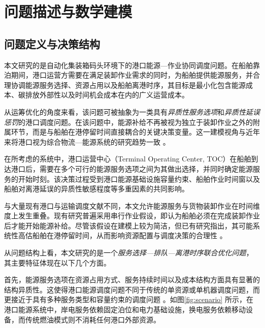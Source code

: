 \documentclass[UTF8, a4paper, 12pt]{ctexart}
\begin{document}

\section{问题描述与数学建模}
\label{sec:model}

\subsection{问题定义与决策结构}
\label{sec:problem_definition_cn}

本文研究的是自动化集装箱码头环境下的港口能源—作业协同调度问题。在船舶靠泊期间，港口运营方需要在满足装卸作业需求的同时，为船舶提供能源服务，并合理协调能源服务选择、资源占用以及船舶离港时序，其目标是最小化包含能源成本、碳排放外部性以及时间机会成本在内的广义运营成本。

从运筹优化的角度来看，该问题可被抽象为一类具有\emph{异质性服务选项}和\emph{异质性延误惩罚}的港口调度问题。在该问题中，能源补给不再被视为独立于装卸作业之外的附属环节，而是与船舶在港停留时间直接耦合的关键决策变量。这一建模视角与近年来将港口视为综合物流—能源系统的研究趋势一致 \cite{andersson2017shipping,bergqvist2019ports}。

在所考虑的系统中，港口运营中心（Terminal Operating Center, TOC）在船舶到达港口后，需要在多个可行的能源服务选项之间为其做出选择，并同时确定能源服务的开始时刻。该决策过程受到港口能源基础设施容量约束、船舶作业时间窗以及船舶对离港延误的异质性敏感程度等多重因素的共同影响。

与大量现有港口与运输调度文献不同，本文允许能源服务与货物装卸作业在时间维度上发生重叠。现有研究普遍采用串行作业假设，即认为船舶必须在完成装卸作业后才能开始能源补给。尽管该假设在建模上较为简洁，但已有研究指出，其可能系统性高估船舶在港停留时间，从而影响资源配置与调度决策的合理性 \cite{Agatz2018,Moshref2020}。

从问题结构上看，本文研究的是一个\emph{服务选择—排队—离港时序联合优化问题}，其主要特征体现在以下几个方面。

首先，能源服务选项在资源占用方式、服务持续时间以及成本结构方面具有显著的结构异质性。这使得港口能源调度问题不同于传统的单资源或单机器调度问题，而更接近于具有多种服务类型和容量约束的调度问题 \cite{brucker2007scheduling}。如图\ref{fig:scenario} 所示，在港口能源系统中，岸电服务依赖固定泊位和电力基础设施，换电服务依赖移动设备，而传统燃油模式则不消耗任何港口外部资源。
\end{document}
